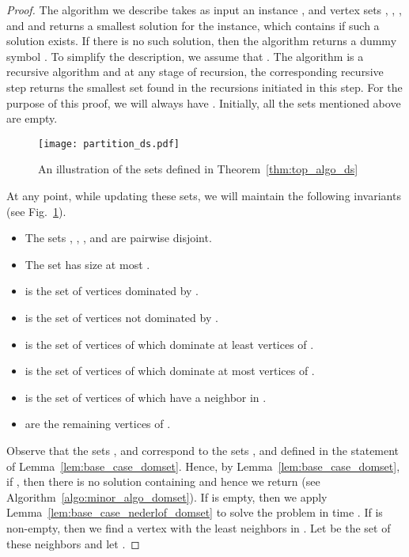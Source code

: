 \begin{proof}

The algorithm we describe takes as input an instance , and vertex sets , , ,  and  and returns a smallest solution for the instance, which contains  if such a solution exists. If there is no such solution, then the algorithm returns a dummy symbol . To simplify the description, we assume that . The algorithm is a recursive algorithm and at any stage of recursion, the corresponding recursive step returns the smallest set found in the recursions initiated in this step.
For the purpose of this proof, we will always have .  Initially, all the sets mentioned above are empty. 




\begin{figure}[t]
\centering
\texttt{[image: partition\_ds.pdf]}
\caption{An illustration of the sets defined in Theorem~\ref{thm:top_algo_ds}}
\label{fig:partition_domset}
\end{figure}



\noindent
At any point, while updating these sets, we will maintain the following invariants (see Fig.~\ref{fig:partition_domset}).
\begin{itemize}
\item The sets , , ,  and  are pairwise disjoint.
\item The set  has size at most .
\item  is the set of vertices dominated by .
\item  is the set of vertices not dominated by .
\item  is the set of vertices of  which dominate at least  vertices of .
\item  is the set of vertices of  which dominate at most  vertices of .
\item  is the set of vertices of  which have a neighbor in .
\item  are the remaining vertices of .
\end{itemize}



\noindent

Observe that the sets ,  and  correspond to the sets ,  and  defined in the statement of Lemma~\ref{lem:base_case_domset}. 
Hence, by Lemma~\ref{lem:base_case_domset}, if , then there is no solution containing  and hence we return  (see Algorithm~\ref{algo:minor_algo_domset}). 
If  is empty, then we apply Lemma~\ref{lem:base_case_nederlof_domset} to solve the problem in time . If  is non-empty, then we find a vertex  with the least neighbors in . Let  be the set of these neighbors and let . 


\end{proof}
